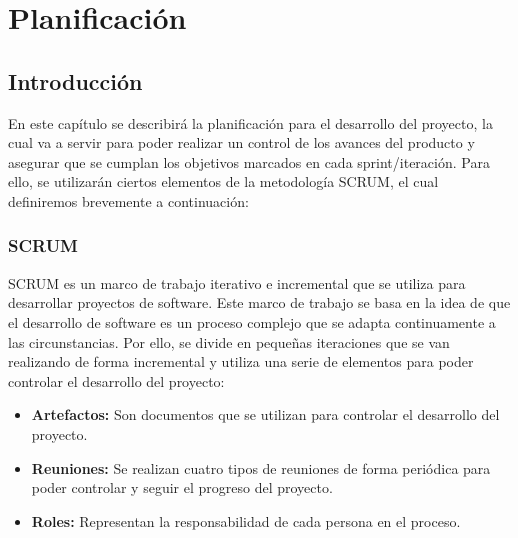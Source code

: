 \chapter{Planificación}

\section{Introducción}
En este capítulo se describirá la planificación para el desarrollo del proyecto, la cual va a servir para poder
realizar un control de los avances del producto y asegurar que se cumplan los objetivos marcados en cada sprint/iteración.
Para ello, se utilizarán ciertos elementos de la metodología SCRUM, el cual definiremos brevemente a continuación:



\subsection*{SCRUM}
SCRUM es un marco de trabajo iterativo e incremental que se utiliza para desarrollar proyectos de software.
Este marco de trabajo se basa en la idea de que el desarrollo de software es un proceso complejo que se adapta continuamente
a las circunstancias. Por ello, se divide en pequeñas iteraciones que se van realizando de forma incremental y utiliza una serie de elementos
para poder controlar el desarrollo del proyecto:
\begin{itemize}
    \item \textbf{Artefactos:} Son documentos que se utilizan para controlar el desarrollo del proyecto.
    \item \textbf{Reuniones: } Se realizan cuatro tipos de reuniones de forma periódica para poder controlar y seguir el progreso del proyecto.
    \item \textbf{Roles:} Representan la responsabilidad de cada persona en el proceso.
\end{itemize}

\hfill

